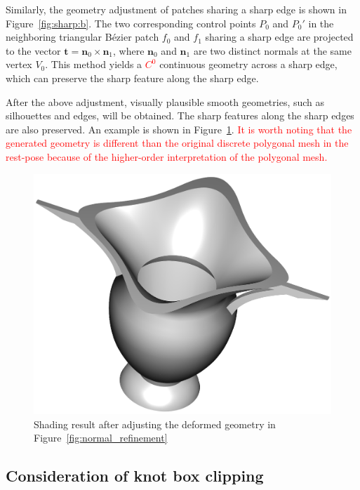 \documentclass[3p]{elsarticle}
\begin{document}
Similarly, the geometry adjustment of patches sharing a sharp edge is shown in Figure~\ref{fig:sharp:b}. The two
corresponding control points $P_0$ and $P_0'$ in the neighboring triangular B\'ezier patch $f_0$ and $f_1$ sharing a
sharp edge are projected to the vector $\mathbf t = \mathbf n_0 \times \mathbf n_1$, where $\mathbf n_0$ and $\mathbf
n_1$ are two distinct normals at the same vertex $V_0$. This method yields a \textcolor{red}{$C^0$} continuous geometry
across a sharp edge, which can preserve the sharp feature along the sharp edge.

After the above adjustment, visually plausible smooth geometries, such as silhouettes and edges, will be obtained. The
sharp features along the sharp edges are also preserved. An example is shown in Figure~\ref{fig:final_result}.
\textcolor{red}{It is worth noting that the generated geometry is different than the original discrete polygonal mesh
in the rest-pose because of the higher-order interpretation of the polygonal mesh.}


\begin{figure}
	\centering
	\includegraphics[width=1.0\linewidth]{pic/final_result.png}
	\caption{Shading result after adjusting the deformed geometry in Figure~\ref{fig:normal_refinement}}
	\label{fig:final_result}
\end{figure}


\subsection{Consideration of knot box clipping}
\end{document}
